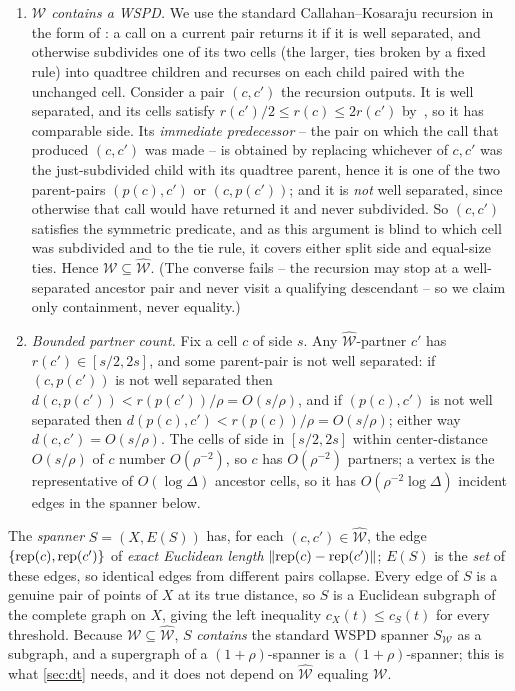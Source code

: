 \begin{enumerate}
\item \emph{$\widehat{\mathcal W}$ contains a WSPD.} We use the standard Callahan--Kosaraju recursion in
the form of \cite[Algorithm~2]{DMOSW25}: a call on a current pair returns it if it is well separated, and
otherwise subdivides one of its two cells (the larger, ties broken by a fixed rule) into quadtree children
and recurses on each child paired with the unchanged cell. Consider a pair $(c,c')$ the recursion outputs.
It is well separated, and its cells satisfy $r(c')/2\le r(c)\le 2r(c')$ by~\cite[Lem.~22]{DMOSW25}, so it
has comparable side. Its \emph{immediate predecessor} -- the pair on which the call that produced $(c,c')$
was made -- is obtained by replacing whichever of $c,c'$ was the just-subdivided child with its quadtree
parent, hence it is one of the two parent-pairs $(p(c),c')$ or $(c,p(c'))$; and it is \emph{not} well
separated, since otherwise that call would have returned it and never subdivided. So $(c,c')$ satisfies the
symmetric predicate, and as this argument is blind to which cell was subdivided and to the tie rule, it
covers either split side and equal-size ties. Hence $\mathcal W\subseteq\widehat{\mathcal W}$. (The converse fails -- the recursion may
stop at a well-separated ancestor pair and never visit a qualifying descendant -- so we claim only
containment, never equality.)
\item \emph{Bounded partner count.} Fix a cell $c$ of side $s$. Any $\widehat{\mathcal W}$-partner $c'$ has
$r(c')\in[s/2,2s]$, and some parent-pair is not well separated: if $(c,p(c'))$ is not well separated then
$d(c,p(c'))<r(p(c'))/\rho=O(s/\rho)$, and if $(p(c),c')$ is not well separated then $d(p(c),c')<
r(p(c))/\rho=O(s/\rho)$; either way $d(c,c')=O(s/\rho)$. The cells of side in $[s/2,2s]$ within
center-distance $O(s/\rho)$ of $c$ number $O(\rho^{-2})$, so $c$ has $O(\rho^{-2})$ partners; a vertex is
the representative of $O(\log\Delta)$ ancestor cells, so it has $O(\rho^{-2}\log\Delta)$ incident edges in
the spanner below.
\end{enumerate}

The \emph{spanner} $S=(X,E(S))$ has, for each $(c,c')\in\widehat{\mathcal W}$, the edge
$\{\operatorname{rep}(c),\operatorname{rep}(c')\}$ of \emph{exact Euclidean length} $\left\lVert \operatorname{rep}(c)-\operatorname{rep}(c') \right\rVert$; $E(S)$ is the \emph{set}
of these edges, so identical edges from different pairs collapse. Every edge of $S$ is a genuine pair of
points of $X$ at its true distance, so $S$ is a Euclidean subgraph of the complete graph on $X$, giving the
left inequality $c_X(t)\le c_S(t)$ for every threshold. Because $\mathcal W\subseteq\widehat{\mathcal W}$,
$S$ \emph{contains} the standard WSPD spanner $S_{\mathcal W}$ as a subgraph, and a supergraph of a
$(1+\rho)$-spanner is a $(1+\rho)$-spanner; this is what \cref{sec:dt} needs, and it does not depend on
$\widehat{\mathcal W}$ equaling $\mathcal W$.

